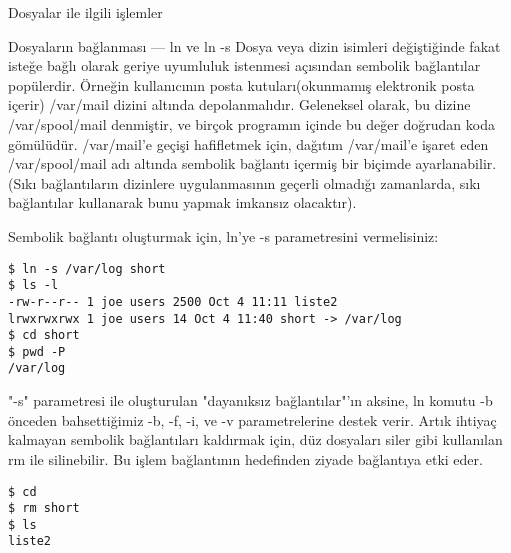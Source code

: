\documentclass[10pt,a5paper]{book}
\begin{document}
\begin{section}{Dosyalar ile ilgili işlemler}
\begin{subsection}{Dosyaların bağlanması — ln ve ln -s}
Dosya veya dizin isimleri değiştiğinde fakat isteğe bağlı olarak geriye uyumluluk istenmesi açısından sembolik bağlantılar popülerdir. Örneğin kullanıcının posta kutuları(okunmamış elektronik posta içerir) /var/mail dizini altında depolanmalıdır. Geleneksel olarak, bu dizine /var/spool/mail denmiştir, ve birçok programın içinde bu değer doğrudan koda gömülüdür. /var/mail'e geçişi hafifletmek için, dağıtım /var/mail'e işaret eden /var/spool/mail adı altında sembolik bağlantı içermiş bir biçimde ayarlanabilir.(Sıkı bağlantıların dizinlere uygulanmasının geçerli olmadığı zamanlarda, sıkı bağlantılar kullanarak bunu yapmak imkansız olacaktır).

Sembolik bağlantı oluşturmak için, ln'ye -s parametresini vermelisiniz:
\begin{verbatim}
$ ln -s /var/log short
$ ls -l
-rw-r--r-- 1 joe users 2500 Oct 4 11:11 liste2
lrwxrwxrwx 1 joe users 14 Oct 4 11:40 short -> /var/log
$ cd short
$ pwd -P
/var/log
\end{verbatim}
"-s" parametresi ile oluşturulan "dayanıksız bağlantılar"'ın aksine, ln komutu -b önceden bahsettiğimiz -b, -f, -i, ve -v parametrelerine destek verir.
Artık ihtiyaç kalmayan sembolik bağlantıları kaldırmak için, düz dosyaları siler gibi kullanılan rm ile silinebilir. Bu işlem bağlantının hedefinden ziyade bağlantıya etki eder.
\begin{verbatim}
$ cd
$ rm short
$ ls
liste2
\end{verbatim}


\end{subsection}
\end{section}
\end{document}
